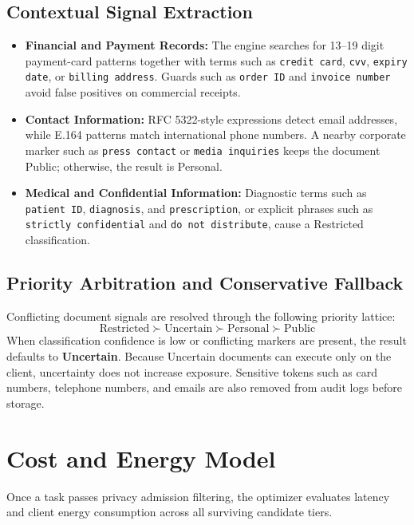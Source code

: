 \documentclass[conference]{IEEEtran}
\begin{document}
\subsection{Contextual Signal Extraction}
\begin{itemize}
  \item \textbf{Financial and Payment Records:} The engine searches for 13--19 digit payment-card patterns together with terms such as \texttt{credit card}, \texttt{cvv}, \texttt{expiry date}, or \texttt{billing address}. Guards such as \texttt{order ID} and \texttt{invoice number} avoid false positives on commercial receipts.
  \item \textbf{Contact Information:} RFC 5322-style expressions detect email addresses, while E.164 patterns match international phone numbers. A nearby corporate marker such as \texttt{press contact} or \texttt{media inquiries} keeps the document Public; otherwise, the result is Personal.
  \item \textbf{Medical and Confidential Information:} Diagnostic terms such as \texttt{patient ID}, \texttt{diagnosis}, and \texttt{prescription}, or explicit phrases such as \texttt{strictly confidential} and \texttt{do not distribute}, cause a Restricted classification.
\end{itemize}

\subsection{Priority Arbitration and Conservative Fallback}
Conflicting document signals are resolved through the following priority lattice:
\begin{equation}
  \text{Restricted} \succ \text{Uncertain} \succ \text{Personal} \succ \text{Public}
\end{equation}
When classification confidence is low or conflicting markers are present, the result defaults to \textbf{Uncertain}.
Because Uncertain documents can execute only on the client, uncertainty does not increase exposure.
Sensitive tokens such as card numbers, telephone numbers, and emails are also removed from audit logs before storage.

\section{Cost and Energy Model}

Once a task passes privacy admission filtering, the optimizer evaluates latency and client energy consumption across all surviving candidate tiers.
\end{document}
